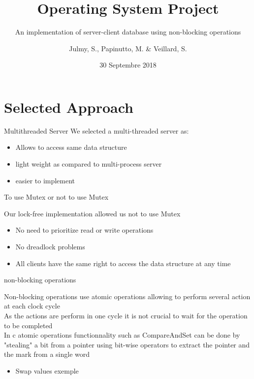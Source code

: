 \documentclass{bredelebeamer}
\title[OS Project]{Operating System Project}
\subtitle{An implementation of server-client database using non-blocking operations}
\author{Julmy, S., Papinutto, M. \& Veillard, S.}
\institute[UniFr]{}
\date{30 Septembre 2018}
\begin{document}
    \begin{frame}
        \titlepage
    \end{frame}


    \section{Selected Approach}

    \begin{frame}{Multithreaded Server}
        We selected a multi-threaded server as: \\
        \begin{itemize}
            \item Allows to access same data structure
            \item light weight as compared to multi-process server
            \item easier to implement
        \end{itemize}
    \end{frame}

     \begin{frame}{To use Mutex or not to use Mutex}

         Our lock-free implementation allowed us not to use Mutex \\

        \begin{itemize}
            \item No need to prioritize read or write operations
            \item No dreadlock problems
            \item All clients have the same right to access the data structure at any time
        \end{itemize}
    \end{frame}

     \begin{frame}{non-blocking operations}

        Non-blocking operations use atomic operations allowing to perform several action at each clock cycle\\
        As the actions are perform in one cycle it is not crucial to wait for the operation to be completed \\
        In c atomic operations functionnality such as CompareAndSet can be done by "stealing" a bit from a pointer
        using bit-wise operators to extract the pointer and the mark from a single word \\

        \begin{itemize}
            \item Swap values exemple
        \end{itemize}
    \end{frame}
\end{document}
